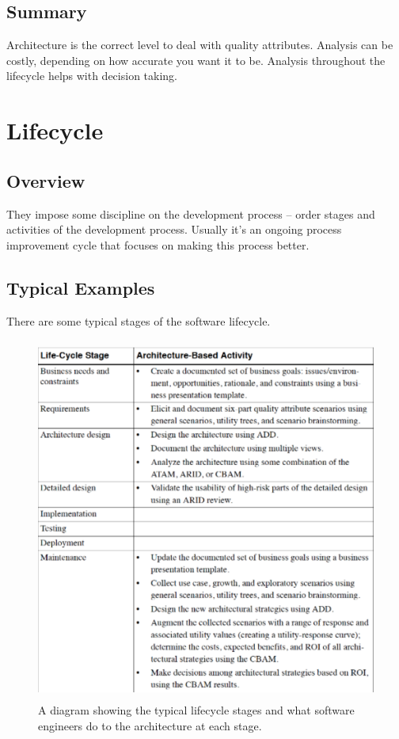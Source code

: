 \documentclass{report}
\begin{document}
\section{Summary}
Architecture is the correct level to deal with quality attributes.
Analysis can be costly, depending on how accurate you want it to be.
Analysis throughout the lifecycle helps with decision taking.

\chapter{Lifecycle}
\section{Overview}
They impose some discipline on the development process – order stages and activities of the development process. Usually it's an ongoing process improvement cycle that focuses on making this process better.

\section{Typical Examples}
There are some typical stages of the software lifecycle.
\begin{figure}[h]
\begin{center} 
    \includegraphics[scale=0.6,width = 15cm, height = 12cm]{images/LifecycleStages.pdf}
    \caption{A diagram showing the typical lifecycle stages and what software engineers do to the architecture at each stage.}
\end{center}
\end{figure}
\end{document}

